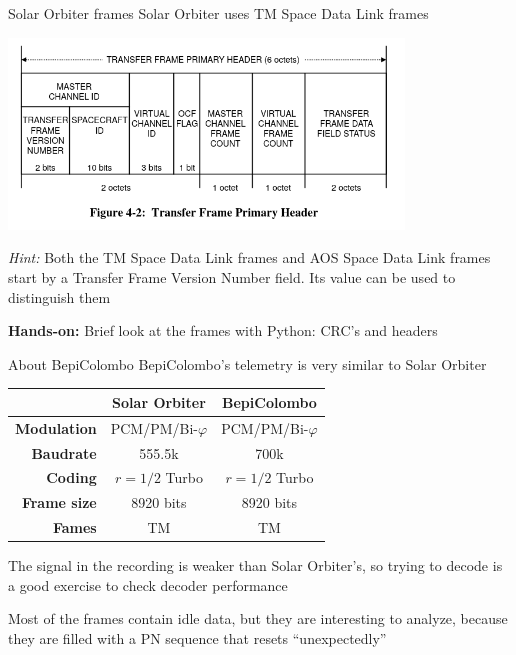 \documentclass[aspectratio=169]{beamer}
\newcommand{\handson}[1]{\begin{frame}
 \begin{block}{}
   \begin{center}
     \vspace{0.5em}
     {\bf Hands-on:} #1
     \vspace{0.5em}
   \end{center}
 \end{block}
 \end{frame}
}
\begin{document}
\begin{frame}{Solar Orbiter frames}
  Solar Orbiter uses TM Space Data Link frames

  \begin{center}
    \includegraphics[width=10.5cm]{tmheader}
  \end{center}

  \emph{Hint:} Both the TM Space Data Link frames and AOS Space Data Link frames
  start by a Transfer Frame Version Number field. Its value can be used to
  distinguish them
\end{frame}

\handson{Brief look at the frames with Python: CRC's and headers}

\begin{frame}{About BepiColombo}
  BepiColombo's telemetry is very similar to Solar Orbiter

  \begin{center}
  \begin{tabular}{r | c | c}
    & {\bf Solar Orbiter} & {\bf BepiColombo} \\
    \hline
    {\bf Modulation} & PCM/PM/Bi-$\varphi$ & PCM/PM/Bi-$\varphi$ \\
    {\bf Baudrate} & 555.5k & 700k\\
    {\bf Coding} & $r = 1/2$ Turbo & $r = 1/2$ Turbo\\
    {\bf Frame size} & 8920 bits & 8920 bits\\
    {\bf Fames} & TM & TM \\
  \end{tabular}
  \end{center}

  The signal in the recording is weaker than Solar Orbiter's, so trying to
  decode is a good exercise to check decoder performance

  \medskip

  Most of the frames contain idle data, but they are interesting to analyze,
  because they are filled with a PN sequence that resets ``unexpectedly''
\end{frame}
\end{document}
